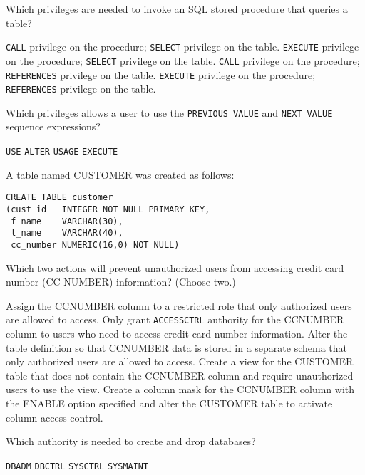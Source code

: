 \documentclass[11pt]{exam}
\begin{document}
\begin{questions}
\question[1]
Which privileges are needed to invoke an SQL stored procedure that queries a table?
\begin{choices}
\choice \texttt{CALL} privilege on the procedure; \texttt{SELECT} privilege on the table.
\choice \texttt{EXECUTE} privilege on the procedure; \texttt{SELECT} privilege on the table.
\choice \texttt{CALL} privilege on the procedure; \texttt{REFERENCES} privilege on the table.
\choice \texttt{EXECUTE} privilege on the procedure; \texttt{REFERENCES} privilege on the table.
\end{choices}

\newpage

\question[1]
Which privileges allows a user to use the \texttt{PREVIOUS VALUE} and \texttt{NEXT VALUE} sequence 
expressions?
\begin{choices}
\choice \texttt{USE}
\choice \texttt{ALTER}
\choice \texttt{USAGE}
\choice \texttt{EXECUTE}
\end{choices}

\question[1]
A table named CUSTOMER was created as follows:
\begin{verbatim}
CREATE TABLE customer
(cust_id   INTEGER NOT NULL PRIMARY KEY,
 f_name    VARCHAR(30),
 l_name    VARCHAR(40),
 cc_number NUMERIC(16,0) NOT NULL)
\end{verbatim}
Which two actions will prevent unauthorized users from accessing credit card number (CC\textunderscore 
NUMBER) information? (Choose two.)
\begin{choices}
\choice Assign the CC\textunderscore NUMBER column to a restricted role that only authorized users
are allowed to access.
\choice Only grant \texttt{ACCESSCTRL} authority for the CC\textunderscore NUMBER column to users who
need to access credit card number information.
\choice Alter the table definition so that CC\textunderscore NUMBER data is stored in a separate schema
that only authorized users are allowed to access.
\choice Create a view for the CUSTOMER table that does not contain the CC\textunderscore NUMBER column
and require unauthorized users to use the view.
\choice Create a column mask for the CC\textunderscore NUMBER column with the ENABLE option specified and 
alter the CUSTOMER table to activate column access control.
\end{choices}

\question[1]
Which authority is needed to create and drop databases?
\begin{choices}
\choice \texttt{DBADM}
\choice \texttt{DBCTRL}
\choice \texttt{SYSCTRL}
\choice \texttt{SYSMAINT}
\end{choices}


\end{questions}
\end{document}
